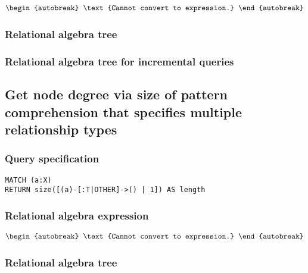 \begin{align*}
\begin{autobreak}
\text{Cannot convert to expression.}
\end{autobreak}
\end{align*}

\subsubsection*{Relational algebra tree}


\subsubsection*{Relational algebra tree for incremental queries}


\subsection{Get node degree via size of pattern comprehension that specifies multiple relationship types}

\subsubsection*{Query specification}

\begin{lstlisting}
MATCH (a:X)
RETURN size([(a)-[:T|OTHER]->() | 1]) AS length
\end{lstlisting}

\subsubsection*{Relational algebra expression}

\begin{align*}
\begin{autobreak}
\text{Cannot convert to expression.}
\end{autobreak}
\end{align*}

\subsubsection*{Relational algebra tree}


